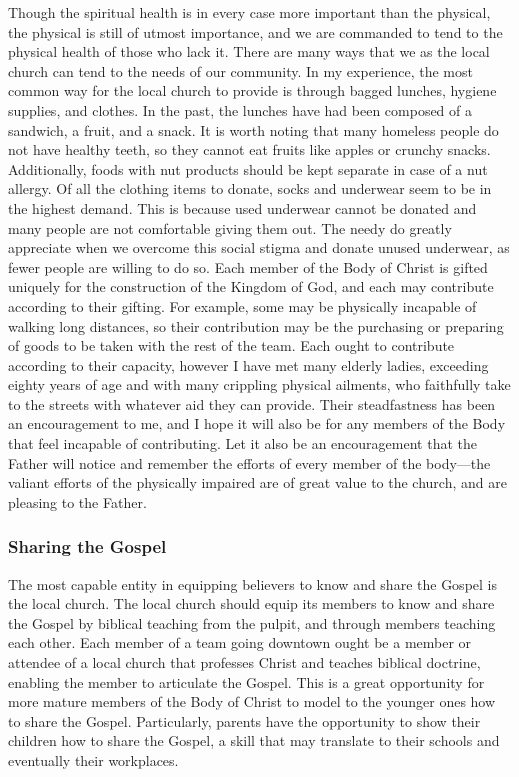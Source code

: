 \documentclass[12pt]{article}
\begin{document}
    \qJamesPhysical
    Though the spiritual health is in every case more important than the physical, the physical is still of utmost importance, and we are commanded to tend to the physical health of those who lack it.
    There are many ways that we as the local church can tend to the needs of our community.
    In my experience, the most common way for the local church to provide is through bagged lunches, hygiene supplies, and clothes.
    In the past, the lunches have had been composed of a sandwich, a fruit, and a snack.
    It is worth noting that many homeless people do not have healthy teeth, so they cannot eat fruits like apples or crunchy snacks.
    Additionally, foods with nut products should be kept separate in case of a nut allergy.
    Of all the clothing items to donate, socks and underwear seem to be in the highest demand.
    This is because used underwear cannot be donated and many people are not comfortable giving them out.
    The needy do greatly appreciate when we overcome this social stigma and donate unused underwear, as fewer people are willing to do so.
    \qHebSix
    Each member of the Body of Christ is gifted uniquely for the construction of the Kingdom of God, and each may contribute according to their gifting.
    For example, some may be physically incapable of walking long distances, so their contribution may be the purchasing or preparing of goods to be taken with the rest of the team.
    Each ought to contribute according to their capacity, however I have met many elderly ladies, exceeding eighty years of age and with many crippling physical ailments, who faithfully take to the streets with whatever aid they can provide.
    Their steadfastness has been an encouragement to me, and I hope it will also be for any members of the Body that feel incapable of contributing.
    Let it also be an encouragement that the Father will notice and remember the efforts of every member of the body---the valiant efforts of the physically impaired are of great value to the church, and are pleasing to the Father.

\subsubsection{Sharing the Gospel}

    \qGreatCommission
    The most capable entity in equipping believers to know and share the Gospel is the local church.
    The local church should equip its members to know and share the Gospel by biblical teaching from the pulpit, and through members teaching each other.
    Each member of a team going downtown ought be a member or attendee of a local church that professes Christ and teaches biblical doctrine, enabling the member to articulate the Gospel.
    This is a great opportunity for more mature members of the Body of Christ to model to the younger ones how to share the Gospel.
    Particularly, parents have the opportunity to show their children how to share the Gospel, a skill that may translate to their schools and eventually their workplaces.
\end{document}
